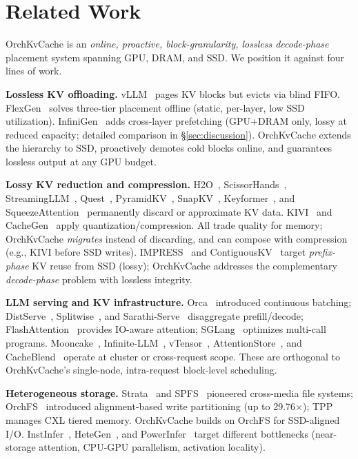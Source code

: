\documentclass[conference]{IEEEtran}
\begin{document}
\section{Related Work}

OrchKvCache is an \emph{online, proactive, block-granularity, lossless decode-phase} placement system spanning GPU, DRAM, and SSD. We position it against four lines of work.

\textbf{Lossless KV offloading.}
vLLM~\cite{vllm} pages KV blocks but evicts via blind FIFO. FlexGen~\cite{flexgen} solves three-tier placement offline (static, per-layer, low SSD utilization). InfiniGen~\cite{infinigen} adds cross-layer prefetching (GPU+DRAM only, lossy at reduced capacity; detailed comparison in \S\ref{sec:discussion}). OrchKvCache extends the hierarchy to SSD, proactively demotes cold blocks online, and guarantees lossless output at any GPU budget.

\textbf{Lossy KV reduction and compression.}
H2O~\cite{h2o}, ScissorHands~\cite{scissorhands}, StreamingLLM~\cite{streamingllm}, Quest~\cite{quest}, PyramidKV~\cite{pyramidkv}, SnapKV~\cite{snapkv}, Keyformer~\cite{keyformer}, and SqueezeAttention~\cite{squeezeattention} permanently discard or approximate KV data. KIVI~\cite{kivi} and CacheGen~\cite{cachegen} apply quantization/compression. All trade quality for memory; OrchKvCache \emph{migrates} instead of discarding, and can compose with compression (e.g., KIVI before SSD writes). IMPRESS~\cite{impress} and ContiguousKV~\cite{contiguouskv} target \emph{prefix-phase} KV reuse from SSD (lossy); OrchKvCache addresses the complementary \emph{decode-phase} problem with lossless integrity.

\textbf{LLM serving and KV infrastructure.}
Orca~\cite{orca} introduced continuous batching; DistServe~\cite{distserve}, Splitwise~\cite{splitwise}, and Sarathi-Serve~\cite{sarathi} disaggregate prefill/decode; FlashAttention~\cite{flashattn,flashattn2} provides IO-aware attention; SGLang~\cite{sglang} optimizes multi-call programs. Mooncake~\cite{mooncake}, Infinite-LLM~\cite{infinitellm}, vTensor~\cite{vtensor}, AttentionStore~\cite{attentionstore}, and CacheBlend~\cite{cacheblend} operate at cluster or cross-request scope. These are orthogonal to OrchKvCache's single-node, intra-request block-level scheduling.

\textbf{Heterogeneous storage.}
Strata~\cite{strata} and SPFS~\cite{spfs} pioneered cross-media file systems; OrchFS~\cite{orchfs} introduced alignment-based write partitioning (up to 29.76$\times$); TPP~\cite{tpp} manages CXL tiered memory. OrchKvCache builds on OrchFS for SSD-aligned I/O. InstInfer~\cite{instinfer}, HeteGen~\cite{hetegen}, and PowerInfer~\cite{powerinfer} target different bottlenecks (near-storage attention, CPU-GPU parallelism, activation locality).
\end{document}
